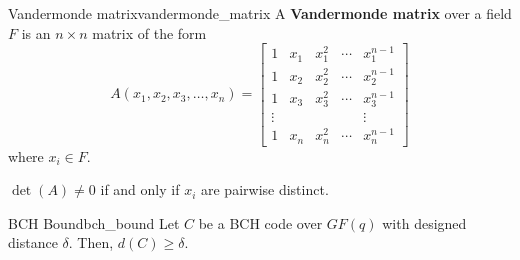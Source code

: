 \begin{Definition}{Vandermonde matrix}{vandermonde_matrix}
    A \textbf{Vandermonde matrix} over a field $ F $ is an
    $ n\times n $ matrix of the form
    \[ A\left(x_{1}, x_{2}, x_{3}, \ldots, x_{n}\right)=\left[\begin{array}{ccccc}
                1      & x_{1} & x_{1}^{2} & \cdots & x_{1}^{n-1} \\
                1      & x_{2} & x_{2}^{2} & \cdots & x_{2}^{n-1} \\
                1      & x_{3} & x_{3}^{2} & \cdots & x_{3}^{n-1} \\
                \vdots &       &           &        & \vdots      \\
                1      & x_{n} & x_{n}^{2} & \cdots & x_{n}^{n-1}
            \end{array}\right] \]
    where $ x_i\in F $.
\end{Definition}

\begin{Theorem}{}{}
    $ \det(A)\neq 0 $ if and only if $ x_i $ are pairwise distinct.
\end{Theorem}

\begin{Theorem}{BCH Bound}{bch_bound}
    Let $ C $ be a BCH code over $ GF(q) $ with designed
    distance $ \delta $. Then, $ d(C)\geqslant \delta $.
\end{Theorem}


